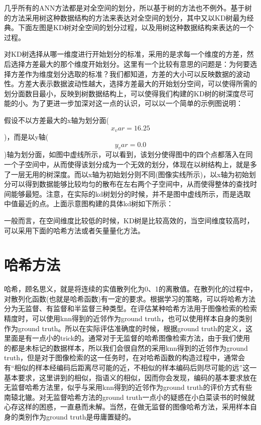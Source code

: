 \documentclass[color=cyan,mathpazo,titlestyle=hang]{elegantbook}
\begin{document}
几乎所有的ANN方法都是对全空间的划分，所以基于树的方法也不例外。基于树的方法采用树这种数据结构的方法来表达对全空间的划分，其中又以KD树最为经典。下面左图是KD树对全空间的划分过程，以及用树这种数据结构来表达的一个过程。

对KD树选择从哪一维度进行开始划分的标准，采用的是求每一个维度的方差，然后选择方差最大的那个维度开始划分。这里有一个比较有意思的问题是：为何要选择方差作为维度划分选取的标准？我们都知道，方差的大小可以反映数据的波动性。方差大表示数据波动性越大，选择方差最大的开始划分空间，可以使得所需的划分面数目最小，反映到树数据结构上，可以使得我们构建的KD树的树深度尽可能的小。为了更进一步加深对这一点的认识，可以以一个简单的示例图说明：

假设不以方差最大的x轴为划分面($$x_var = 16.25$$)，而是以y轴($$y_var = 0.0$$)轴为划分面，如图中虚线所示，可以看到，该划分使得图中的四个点都落入在同一个子空间中，从而使得该划分成为一个无效的划分，体现在以树结构上，就是多了一层无用的树深度。而以x轴为初始划分则不同(图像实线所示)，以x轴为初始划分可以得到数据能够比较均匀的散布在左右两个子空间中，从而使得整体的查找时间能够最短。注意，在实际的kd树划分的时候，并不是图中虚线所示，而是选取中值最近的点。上面示意图构建的具体kd树如下所示：

一般而言，在空间维度比较低的时候，KD树是比较高效的，当空间维度较高时，可以采用下面的哈希方法或者矢量量化方法。

\section{哈希方法}

哈希，顾名思义，就是将连续的实值散列化为0、1的离散值。在散列化的过程中，对散列化函数(也就是哈希函数)有一定的要求。根据学习的策略，可以将哈希方法分为无监督、有监督和半监督三种类型。在评估某种哈希方法用于图像检索的检索精度时，可以使用knn得到的近邻作为ground truth，也可以使用样本自身的类别作为ground truth。所以在实际评估准确度的时候，根据ground truth的定义，这里面是有一点小的trick的。通常对于无监督的哈希图像检索方法，由于我们使用的都是未标记的数据样本，所以我们会很自然的采用knn得到的近邻作为ground truth，但是对于图像检索的这一任务时，在对哈希函数的构造过程中，通常会有“相似的样本经编码后距离尽可能的近，不相似的样本编码后则尽可能的远”这一基本要求，这里讲到的相似，指语义的相似，因而你会发现，编码的基本要求放在无监督哈希方法里，似乎与采用knn得到的近邻作为ground truth的评价方式有些南辕北辙。对无监督哈希方法的ground truth一点小的疑惑在小白菜读书的时候就心存这样的困惑，一直悬而未解。当然，在做无监督的图像哈希方法，采用样本自身的类别作为ground truth是毋庸置疑的。
\end{document}
